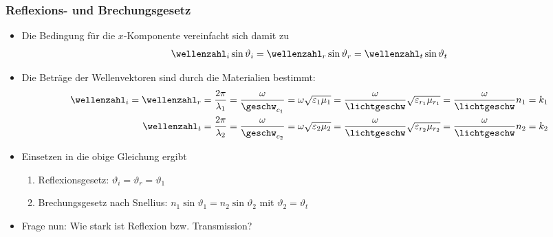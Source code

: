 \begin{frame}
  \frametitle{Reflexions- und Brechungsgesetz}
  \begin{itemize}[<+->]
  \item Die Bedingung für die \(x\)-Komponente vereinfacht sich damit zu
    \begin{equation*}
      \wellenzahl_i\sin\vartheta_i = \wellenzahl_r\sin\vartheta_r =\wellenzahl_t\sin\vartheta_t
    \end{equation*}
  \item Die Beträge der Wellenvektoren sind durch die Materialien bestimmt:
    \begin{align*}
      \wellenzahl_i = \wellenzahl_r &= \frac{2\pi}{\lambda_1} = \frac{\omega}{\geschw_{c_1}} = \omega\sqrt{\varepsilon_1\mu_1} = \frac{\omega}{\lichtgeschw}\sqrt{\varepsilon_{r_1}\mu_{r_1}} = \frac{\omega}{\lichtgeschw} n_1 = k_1\\ 
      \wellenzahl_t &= \frac{2\pi}{\lambda_2} = \frac{\omega}{\geschw_{c_2}} = \omega\sqrt{\varepsilon_2\mu_2} = \frac{\omega}{\lichtgeschw}\sqrt{\varepsilon_{r_2}\mu_{r_2}} = \frac{\omega}{\lichtgeschw} n_2 = k_2
    \end{align*}
  \item Einsetzen in die obige Gleichung ergibt
    \begin{enumerate}[<+->]
    \item Reflexionsgesetz: \(\boxed{\vartheta_i=\vartheta_r}=\vartheta_1\)
      \item Brechungsgesetz nach Snellius: \(\boxed{ n_1\sin\vartheta_1 = n_2\sin\vartheta_2}\) mit \(\vartheta_2=\vartheta_t\)
      \end{enumerate}
      \item Frage nun: Wie stark ist Reflexion bzw. Transmission?
  \end{itemize}
\end{frame}



